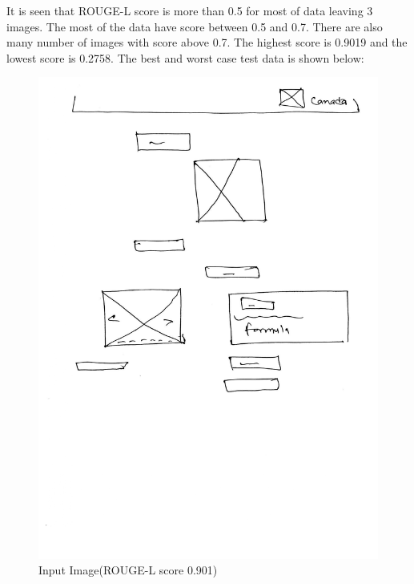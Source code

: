 It is seen that ROUGE-L score is more than 0.5 for most of data leaving 3 images. The most of the data have score between 0.5 and 0.7. There are also many number of images with score above 0.7. The highest score is 0.9019 and the lowest score is 0.2758. The best and worst case test data is shown below:
\begin{figure}[H]
    \centering
    \includegraphics[scale=.35, trim=230 300 190 10]{images/m11.jpg}
    \caption{Input Image(ROUGE-L score 0.901)}
    \label{fig:m11}
\end{figure}

